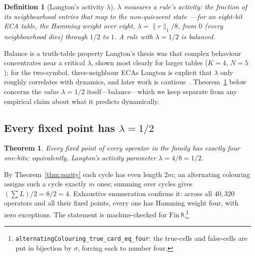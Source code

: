 \documentclass[man,12pt,floatsintext]{apa7}
\newcommand{\sig}{\sigma}
\newtheorem{theorem}{Theorem}
\newtheorem{definition}{Definition}
\begin{document}
\begin{definition}[Langton's activity $\lambda$]\label{def:lambda}
$\lambda$ measures a rule's \emph{activity}: the fraction of its neighbourhood
entries that map to the non-quiescent
state~\parencite{langton1990computation}---for an eight-bit ECA table, the
Hamming weight over eight, $\lambda = \lVert r \rVert_1 / 8$, from $0$ (every
neighbourhood dies) through $1/2$ to $1$. A rule with $\lambda = 1/2$ is
\emph{balanced}.
\end{definition}

\begin{observation}[label={obs:lambda}]{Balance is a truth-table property}
Langton's thesis was that complex behaviour concentrates near a critical
$\lambda$, shown most clearly for larger tables ($K=4$, $N=5$); for the
two-symbol, three-neighbour ECAs Langton is explicit that $\lambda$ only roughly
correlates with dynamics, and later work is
cautious~\parencite{mitchell1993revisiting}. Theorem~\ref{thm:lambda} below
concerns the \emph{value} $\lambda = 1/2$ itself---balance---which we keep
separate from any empirical claim about what it predicts dynamically.
\end{observation}

\subsection{Every fixed point has $\lambda = 1/2$}

\begin{theorem}\label{thm:lambda}
Every fixed point of every operator in the family has exactly four one-bits;
equivalently, Langton's activity parameter $\lambda = 4/8 = 1/2$.
\end{theorem}

\noindent By Theorem~\ref{thm:parity} each cycle has even length $2m$; an
alternating colouring assigns such a cycle exactly $m$ ones; summing over
cycles gives $(\sum L)/2 = 8/2 = 4$. Exhaustive enumeration confirms it:
across all $40{,}320$ operators and all their fixed points, every one has
Hamming weight four, with zero exceptions. The statement is machine-checked
for $\mathrm{Fin}\,8$.\footnote{%
\texttt{alternatingColouring\_true\_card\_eq\_four}: the true-cells and
false-cells are put in bijection by $\sig$, forcing each to number four.}
\end{document}
